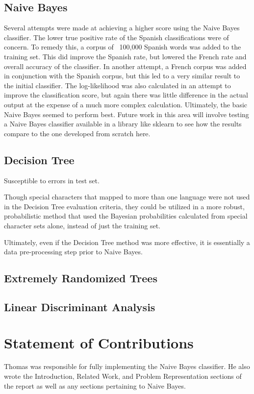\documentclass[conference]{IEEEtran}
\begin{document}
\subsection{Naive Bayes}
Several attempts were made at achieving a higher score using the Naive Bayes classifier. The lower true positive rate of the Spanish classifications were of concern. To remedy this, a corpus of ~100,000 Spanish words was added to the training set. This did improve the Spanish rate, but lowered the French rate and overall accuracy of the classifier. In another attempt, a French corpus was added in conjunction with the Spanish corpus, but this led to a very similar result to the initial classifier.
The log-likelihood was also calculated in an attempt to improve the classification score, but again there was little difference in the actual output at the expense of a much more complex calculation. Ultimately, the basic Naive Bayes seemed to perform best. Future work in this area will involve testing a Naive Bayes classifier available in a library like sklearn to see how the results compare to the one developed from scratch here. 

\subsection{Decision Tree}
Susceptible to errors in test set.

Though special characters that mapped to more than one language were not used in the Decision Tree evaluation criteria, they could be utilized in a more robust, probabilistic method that used the  Bayesian probabilities calculated from special character sets alone, instead of just the training set.

Ultimately, even if the Decision Tree method was more effective, it is essentially a data pre-processing step prior to Naive Bayes. 


\subsection{Extremely Randomized Trees}
\subsection{Linear Discriminant Analysis} %


\section{Statement of Contributions}
Thomas was responsible for fully implementing the Naive Bayes classifier. He also wrote the Introduction, Related Work, and Problem Representation sections of the report as well as any sections pertaining to Naive Bayes.
\end{document}
